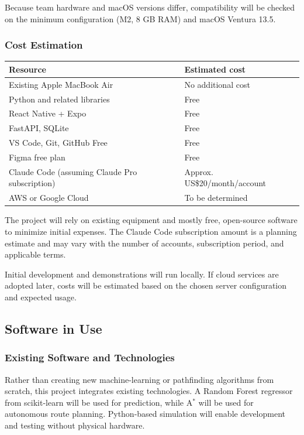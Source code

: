 \documentclass[conference]{IEEEtran}
\begin{document}
Because team hardware and macOS versions differ, compatibility will be checked on the minimum configuration (M2, 8 GB RAM) and macOS Ventura 13.5.

\subsubsection{Cost Estimation}
\begin{table}[htbp]\centering\footnotesize\begin{tabularx}{\columnwidth}{|p{}|X|}\hline
\textbf{Resource} & \textbf{Estimated cost} \\ \hline
Existing Apple MacBook Air & No additional cost \\ \hline
Python and related libraries & Free \\ \hline
React Native + Expo & Free \\ \hline
FastAPI, SQLite & Free \\ \hline
VS Code, Git, GitHub Free & Free \\ \hline
Figma free plan & Free \\ \hline
Claude Code (assuming Claude Pro subscription) & Approx. US\$20/month/account \\ \hline
AWS or Google Cloud & To be determined \\ \hline
\end{tabularx}\end{table}
The project will rely on existing equipment and mostly free, open-source software to minimize initial expenses. The Claude Code subscription amount is a planning estimate and may vary with the number of accounts, subscription period, and applicable terms.

Initial development and demonstrations will run locally. If cloud services are adopted later, costs will be estimated based on the chosen server configuration and expected usage.

\subsection{Software in Use}
\subsubsection{Existing Software and Technologies}
Rather than creating new machine-learning or pathfinding algorithms from scratch, this project integrates existing technologies. A Random Forest regressor from scikit-learn will be used for prediction, while A$^*$ will be used for autonomous route planning. Python-based simulation will enable development and testing without physical hardware.
\end{document}
